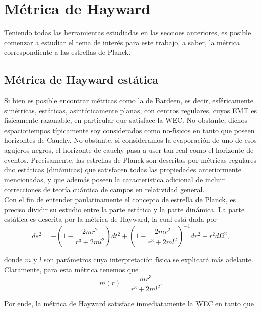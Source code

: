 \documentclass[16pt,a4paper]{article}
\numberwithin{equation}{section}
\theoremstyle{definition}
\begin{document}
\newpage
\section{\label{planck stars section} Métrica de Hayward}

Teniendo todas las herramientas estudiadas en las seccioes anteriores, es posible comenzar a estudiar el tema de interés para este trabajo, a saber, la métrica correspondiente a las estrellas de Planck.

\subsection{Métrica de Hayward estática}

Si bien es posible encontrar métricas como la de Bardeen, es decir, esféricamente simétricas, estáticas, asintóticamente planas, con centros regulares, cuyos EMT es físicamente razonable, en particular que satisface la WEC. No obstante, dichos espaciotiempos típicamente soy considerados como no-físicos en tanto que poseen horizontes de Cauchy. No obstante, si consideramos la evaporación de uno de esos agujeros negros, el horizonte de cauchy pasa a user tan real como el horizonte de eventos.  Precisamente, las estrellas de Planck son descritas por métricas regulares dno estáticas (dinámicas) que satisfacen todas las propiedades anteriormente mencionadas, y que además poseen la característica adicional de incluir correcciones de teoría cuántica de campos en relatividad general.\\

Con el fin de entender paulatinamente el concepto de estrella de Planck, es preciso dividir su estudio entre la parte estática y la parte dinámica. La parte estática es descrita por la métrica de Hayward, la cual está dada por 
\begin{equation}
\label{hayward metric}
ds^2 = -\left( 1 - \frac{2mr^2}{r^3 + 2ml^2} \right) dt^2 + \left( 1 - \frac{2mr^2}{r^3 + 2ml^2} \right)^{-1} dr^2 + r^2d\Omega ^2,
\end{equation}

donde $m$ y $l$ son parámetros cuya interpretación física se explicará más adelante. Claramente, para esta métrica tenemos que
\begin{equation}
\label{hayward mass}
m(r) =  \frac{mr^3}{r^3 + 2ml^2}.
\end{equation}

Por ende, la métrica de Hayward satisface inmediatamente la WEC en tanto que 
\end{document}
